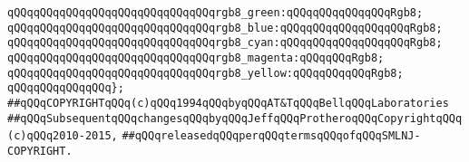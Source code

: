 \verb|qQQqqQQqqQQqqQQqqQQqqQQqqQQqqQQqrgb8_green:qQQqqQQqqQQqqQQqRgb8;|\newline
\verb|qQQqqQQqqQQqqQQqqQQqqQQqqQQqqQQqrgb8_blue:qQQqqQQqqQQqqQQqqQQqRgb8;|\newline
\verb|qQQqqQQqqQQqqQQqqQQqqQQqqQQqqQQqrgb8_cyan:qQQqqQQqqQQqqQQqqQQqRgb8;|\newline
\verb|qQQqqQQqqQQqqQQqqQQqqQQqqQQqqQQqrgb8_magenta:qQQqqQQqRgb8;|\newline
\verb|qQQqqQQqqQQqqQQqqQQqqQQqqQQqqQQqrgb8_yellow:qQQqqQQqqQQqRgb8;|\newline
\verb|qQQqqQQqqQQqqQQq};|\newline
\newline
\newline
\verb|##qQQqCOPYRIGHTqQQq(c)qQQq1994qQQqbyqQQqAT&TqQQqBellqQQqLaboratories|\newline
\verb|##qQQqSubsequentqQQqchangesqQQqbyqQQqJeffqQQqProtheroqQQqCopyrightqQQq(c)qQQq2010-2015,|\newline
\verb|##qQQqreleasedqQQqperqQQqtermsqQQqofqQQqSMLNJ-COPYRIGHT.|\newline

